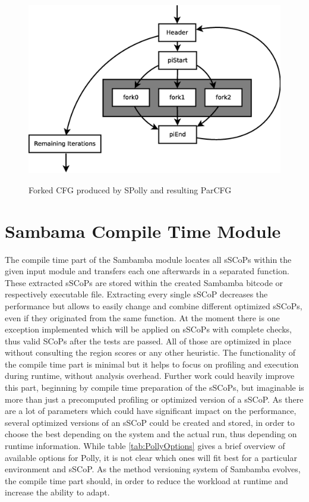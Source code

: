 \begin{figure}[htbp]
{\begin{minipage}[c][8cm]{0.50\textwidth}
    \includegraphics[width=\textwidth]{Figures/ForkJoinParCFG.eps}
    \label{fig:ForkJoinParCFG}
    \end{minipage}
  }
  \caption{Forked CFG produced by SPolly and resulting ParCFG}
  \label{fig:CreateParCFG}  
\end{figure}
\resetlst

\section{Sambama Compile Time Module}
The compile time part of the Sambamba module locates all sSCoPs
within the given input module and transfers each one afterwards in a separated 
function. These extracted sSCoPs are stored within the created Sambamba 
bitcode or respectively executable file. Extracting every single sSCoP 
decreases the performance but allows to easily change and combine different 
optimized sSCoPs, even if they originated from the same function.   
At the moment there is one exception implemented which will be applied on sSCoPs
with complete checks, thus valid SCoPs after the tests are passed. All of those
are optimized in place without consulting the region scores or any other heuristic.
The functionality of the compile time part is minimal but it helps to focus 
on profiling and execution during runtime, without analysis overhead. 
Further work could heavily improve this part, beginning by compile time 
preparation of the sSCoPs, but imaginable is more than just a precomputed
profiling or optimized version of a sSCoP.
As there are a lot of parameters which could have significant impact 
on the performance, several optimized versions of an sSCoP could be created
and stored, in order to choose the best depending on the system and the actual
run, thus depending on runtime information.
While table \ref{tab:PollyOptions} gives a brief
overview of available options for Polly, it is not clear which ones will
fit best for a particular environment and sSCoP. 
As the method versioning system of Sambamba evolves, the compile time part 
should, in order to reduce the workload at runtime and increase the ability to
adapt. 

